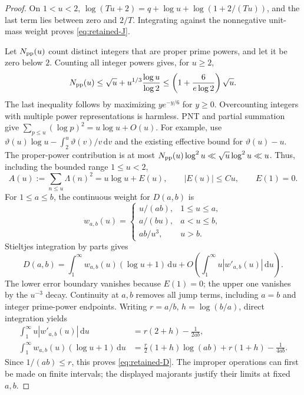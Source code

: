 \documentclass[11pt]{article}
\newcommand{\dd}{\,\mathrm d}
\begin{document}
\begin{proof}
On \(1<u<2\),
\(\log(Tu+2)=q+\log u+\log(1+2/(Tu))\), and the last term lies
between zero and \(2/T\). Integrating against the nonnegative
unit-mass weight proves \eqref{eq:retained-J}.

Let \(N_{\rm pp}(u)\) count distinct integers that are proper prime
powers, and let it be zero below \(2\). Counting all integer powers gives,
for \(u\geq2\),
\[
 N_{\rm pp}(u)\leq\sqrt u+u^{1/3}\frac{\log u}{\log2}
 \leq\left(1+\frac{6}{e\log2}\right)\sqrt u.
\]
The last inequality follows by maximizing \(y e^{-y/6}\) for \(y\geq0\).
Overcounting integers with multiple power representations is harmless.
PNT and partial summation give
\(\sum_{p\leq u}(\log p)^2=u\log u+O(u)\).
For example, use
\(\vartheta(u)\log u-\int_2^u\vartheta(v)/v\dd v\) and the existing
effective bound for \(\vartheta(u)-u\).
The proper-power contribution is at most
\(N_{\rm pp}(u)\log^2u\ll\sqrt u\log^2u\ll u\).
Thus, including the bounded range \(1\leq u<2\),
\[
 A(u):=\sum_{n\leq u}\Lambda(n)^2=u\log u+E(u),\qquad
 |E(u)|\leq C u,\qquad E(1)=0.
\]
For \(1\leq a\leq b\), the continuous weight for \(D(a,b)\) is
\[
 w_{a,b}(u)=
 \begin{cases}
 u/(ab),&1\leq u\leq a,\\
 a/(bu),&a<u\leq b,\\
 ab/u^3,&u>b.
 \end{cases}
\]
Stieltjes integration by parts gives
\[
 D(a,b)=\int_1^\infty w_{a,b}(u)(\log u+1)\dd u
              +O\left(\int_1^\infty u|w'_{a,b}(u)|\dd u\right).
\]
The lower error boundary vanishes because \(E(1)=0\); the upper one
vanishes by the \(u^{-3}\) decay. Continuity at \(a,b\) removes all jump
terms, including \(a=b\) and integer prime-power endpoints.
Writing \(r=a/b\), \(h=\log(b/a)\), direct integration yields
\begin{align*}
 \int_1^\infty u|w'_{a,b}(u)|\dd u
 &=r(2+h)-\frac1{2ab},\\
 \int_1^\infty w_{a,b}(u)(\log u+1)\dd u
 &=\frac r2(1+h)\log(ab)+r(1+h)-\frac1{4ab}.
\end{align*}
Since \(1/(ab)\leq r\), this proves \eqref{eq:retained-D}.
The improper operations can first be made on finite intervals; the
displayed majorants justify their limits at fixed \(a,b\).


\end{proof}
\end{document}
